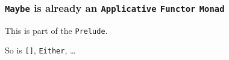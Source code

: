 \begin{frame}

\frametitle{\texttt{Maybe} is already an \texttt{Applicative} \texttt{Functor}
\texttt{Monad}}

\vspace{\fill}

\begin{center}

This is part of the \texttt{Prelude}.

\vspace{\fill}

So is \texttt{[]}, \texttt{Either}, \ldots

\end{center}

\vspace{\fill}

\end{frame}
